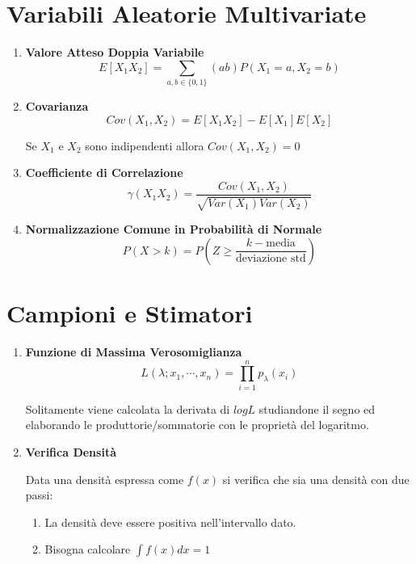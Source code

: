 \documentclass{article}
\begin{document}
\section{Variabili Aleatorie Multivariate}

\begin{enumerate}
    \item \textbf{Valore Atteso Doppia Variabile}
    \[ \boxed{E[X_1X_2] = \sum_{a,b \in \{ 0,1 \}} (ab)P(X_1 = a, X_2 = b)} \]
    \item \textbf{Covarianza}
    \[ \boxed{Cov(X_1,X_2) = E[X_1X_2] - E[X_1]E[X_2]} \]
    \begin{center}
        Se $X_1$ e $X_2$ sono indipendenti allora $Cov(X_1,X_2) = 0$
    \end{center}
    \item \textbf{Coefficiente di Correlazione}
    \[ \boxed{\gamma(X_1X_2) = \frac{Cov(X_1,X_2)}{\sqrt{Var(X_1)Var(X_2)}}} \]
\newpage
    \item \textbf{Normalizzazione Comune in Probabilità di Normale}
    \[ \boxed{P(X > k) = P \left( Z \geq \frac{k - \text{media}}{\text{deviazione std}} \right)} \]

\end{enumerate}

\section{Campioni e Stimatori}

\begin{enumerate}
    \item \textbf{Funzione di Massima Verosomiglianza}
    \[ \boxed{L(\lambda; x_1, \cdots, x_n) = \prod_{i=1}^{n} p_{\lambda}(x_i) } \]
    \begin{center}
        Solitamente viene calcolata la derivata di $log L$ studiandone il segno ed elaborando le produttorie/sommatorie con le proprietà del logaritmo.
    \end{center}
    \item \textbf{Verifica Densità}
    
    Data una densità espressa come $f(x)$ si verifica che sia una densità con due passi:
    \begin{enumerate}
        \item La densità deve essere positiva nell'intervallo dato.
        \item Bisogna calcolare $\boxed{\int f(x)dx = 1}$
    \end{enumerate}
\end{enumerate}
\end{document}
